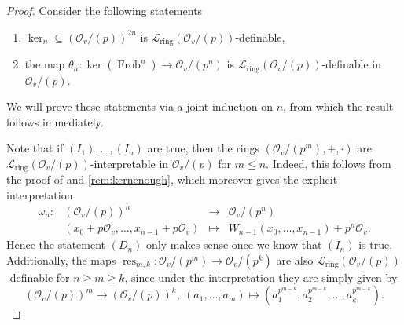 \documentclass[a4paper]{amsart}
\theoremstyle{mystyle2}
\theoremstyle{mystyle}
\DeclareMathOperator{\res}{res}
\DeclareMathOperator{\Frob}{Frob}
\renewcommand{\L}{\mathcal{L}}
\newcommand{\Lring}{\L_{\mathrm{ring}}}
\renewcommand{\O}{\mathcal{O}}
\numberwithin{equation}{section}
\begin{document}
    \begin{proof} 
        Consider the following statements
        \begin{enumerate}
            \item[($I_n$)] $\ker_n\subseteq (\O_v/(p))^{2n}$ is $\Lring(\O_v/(p))$-definable,
            \item[($D_n$)] the map $\theta_n\colon \ker(\Frob^{n})\to \O_v/(p^{n})$ is $\Lring(\O_v/(p))$-definable in $\O_v/(p)$.
        \end{enumerate}
        We will prove these statements via a joint induction on $n$, from which the result follows immediately.
        
        Note that if $(I_1), \ldots, (I_n)$ are true, then the rings $(\O_v/(p^m), +, \cdot)$ are $\Lring(\O_v/(p))$-interpretable in $\O_v/(p)$ for $m\leq n$.
        Indeed, this follows from the proof of  and \cref{rem:kernenough}, 
        which moreover gives the explicit interpretation
        \[
        \begin{array}{rrcl}
        \omega_n\colon& (\O_v / (p))^n &\to& \O_v / (p^n)\\ &(x_0+p\O_v, \ldots, x_{n-1}+p\O_v)&\mapsto &W_{n-1}(x_0, \ldots, x_{n-1})+p^n\O_v.
        \end{array}
        \]
        Hence the statement $(D_n)$ only makes sense once we know that $(I_n)$ is true.
        Additionally, the maps $\res_{m, k}\colon \O_v/(p^m)\to \O_v/(p^k)$ are also $\Lring(\O_v/(p))$-definable for $n\geq m\geq k$, since under the interpretation they are simply given by
        \[
        (\O_v/(p))^m\to (\O_v / (p))^k,\ (a_1, \ldots, a_m)\mapsto (a_1^{p^{m-k}}, a_2^{p^{m-k}}, \ldots, a_k^{p^{m-k}}).
        \]


\end{proof}
\end{document}
